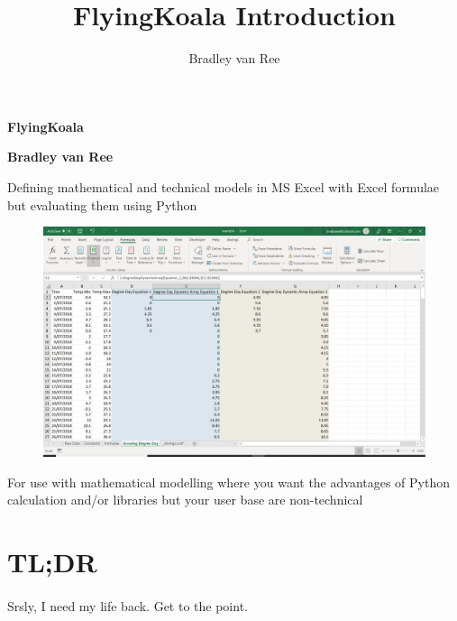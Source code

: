 \documentclass[12pt,a4paper,twoside,openright,titlepage]{article}
\author{Bradley van Ree}
\title{FlyingKoala Introduction}
\begin{document}
\begin{titlepage}
   \begin{center}
       \vspace*{1cm}

       \textbf{FlyingKoala}

       \vspace{2cm}

       \textbf{Bradley van Ree}

       \vspace{2cm}

       Defining mathematical and technical models in MS Excel with Excel formulae but evaluating them using Python

\vfill

		\begin{figure}[h!]
			\centering
			\includegraphics[scale=0.4]{images/degreedaydynamicarray_equation_1.PNG}
		\end{figure}

\vfill

       For use with mathematical modelling where you want the advantages of Python calculation and/or libraries but your user base are non-technical

       \vfill

   \end{center}
\end{titlepage}

\tableofcontents

\newpage

\section{TL;DR}
\paragraph{} Srsly, I need my life back. Get to the point.
\end{document}

